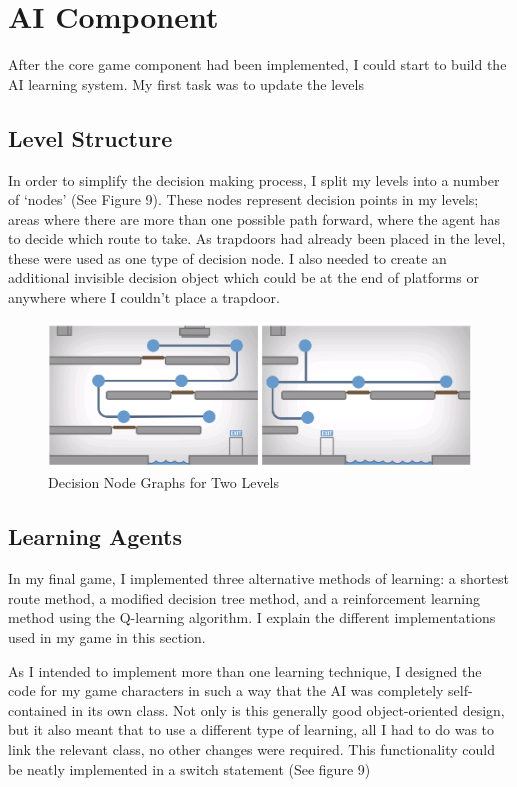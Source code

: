 \documentclass[a4paper,oneside]{report}
\begin{document}
\chapter{AI Component}

After the core game component had been implemented, I could start to build the AI learning system. My first task was to update the levels 

\section{Level Structure}

In order to simplify the decision making process, I split my levels into a number of `nodes' (See Figure 9). These nodes represent decision points in my levels; areas where there are more than one possible path forward, where the agent has to decide which route to take. As trapdoors had already been placed in the level, these were used as one type of decision node. I also needed to create an additional invisible decision object which could be at the end of platforms or anywhere where I couldn't place a trapdoor. 

\begin{figure}[h!]
  \centering
    \includegraphics[width=140mm]{sources/images/LevelNodes}
    \caption{Decision Node Graphs for Two Levels}
\end{figure}

\section{Learning Agents}

In my final game, I implemented three alternative methods of learning: a shortest route method, a modified decision tree method, and a reinforcement learning method using the Q-learning algorithm. I explain the different implementations used in my game in this section.

As I intended to implement more than one learning technique, I designed the code for my game characters in such a way that the AI was completely self-contained in its own class. Not only is this generally good object-oriented design, but it also meant that to use a different type of learning, all I had to do was to link the relevant class, no other changes were required. This functionality could be neatly implemented in a switch statement (See figure 9)
\end{document}
